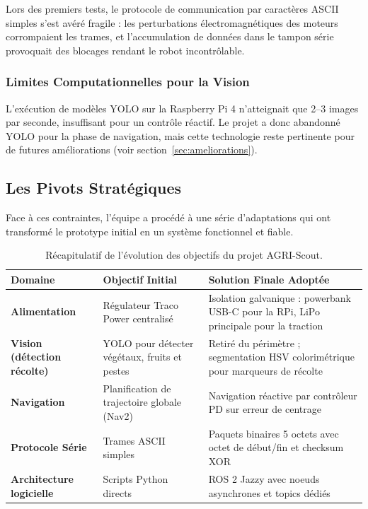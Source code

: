 Lors des premiers tests, le protocole de communication par caractères ASCII simples s'est avéré fragile : les perturbations électromagnétiques des moteurs corrompaient les trames, et l'accumulation de données dans le tampon série provoquait des blocages rendant le robot incontrôlable.

\subsubsection{Limites Computationnelles pour la Vision}

L'exécution de modèles YOLO sur la Raspberry Pi 4 n'atteignait que 2--3 images par seconde, insuffisant pour un contrôle réactif. Le projet a donc abandonné YOLO pour la phase de navigation, mais cette technologie reste pertinente pour de futures améliorations (voir section~\ref{sec:ameliorations}).

\subsection{Les Pivots Stratégiques}

Face à ces contraintes, l'équipe a procédé à une série d'adaptations qui ont transformé le prototype initial en un système fonctionnel et fiable.

\begin{table}[H]
\centering
\caption{Récapitulatif de l'évolution des objectifs du projet AGRI-Scout.}
\label{tab:evolution}
\renewcommand{\arraystretch}{1.4}
\begin{tabularx}{\textwidth}{|>{\bfseries}p{3.5cm}|X|X|}
\hline
\rowcolor{headerblue!20}
\textbf{Domaine} & \textbf{Objectif Initial} & \textbf{Solution Finale Adoptée} \\
\hline
Alimentation & Régulateur Traco Power centralisé & Isolation galvanique : powerbank USB-C pour la RPi, LiPo principale pour la traction \\
\hline
\rowcolor{rowalt}
Vision (détection récolte) & YOLO pour détecter végétaux, fruits et pestes & Retiré du périmètre ; segmentation HSV colorimétrique pour marqueurs de récolte \\
\hline
Navigation & Planification de trajectoire globale (Nav2) & Navigation réactive par contrôleur PD sur erreur de centrage \\
\hline
\rowcolor{rowalt}
Protocole Série & Trames ASCII simples & Paquets binaires 5 octets avec octet de début/fin et checksum XOR \\
\hline
Architecture logicielle & Scripts Python directs & ROS 2 Jazzy avec noeuds asynchrones et topics dédiés \\
\hline
\end{tabularx}
\end{table}

